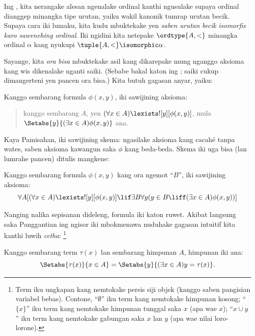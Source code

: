 \documentclass[../../../include/open-logic-section]{subfiles}
\begin{document}

Ing , kita nerangake
alesan ngenalake ordinal kanthi ngusulake supaya
ordinal dianggep minangka tipe urutan, yaiku wakil
kanonik tumrap urutan becik. Supaya cara iki lumaku,
kita kudu mbuktekake yen \emph{saben urutan becik
isomorfis karo sawenehing ordinal}. Iki ngidini
kita netepake $\ordtype{A, <}$ minangka ordinal
$\alpha$ kang nyukupi $\tuple{A, <} \isomorphic \alpha$.

Sayange, kita \emph{ora bisa} mbuktekake asil kang
dikarepake mung nganggo aksioma kang wis dikenalake
nganti saiki. (Sebabe bakal katon ing
; saiki cukup
dimangerteni yen pancen ora bisa.) Kita butuh
gagasan anyar, yaiku:

\begin{axiom}
Kanggo sembarang formula $\phi(x, y)$, iki sawijining aksioma:
\begin{quote}
	kanggo sembarang $A$, yen
	$(\forall x \in A)\lexists![y][\phi(x,y)]$, mula
	$\Setabs{y}{(\exists x \in A)\phi(x,y)}$ ana.
\end{quote}
\end{axiom}
\noindent
Kaya Pamisahan, iki sawijining skema: ngasilake
aksioma kang cacahé tanpa wates, saben aksioma kawangun saka
$\phi$ kang beda-beda. Skema iki uga bisa (lan
lumrahe pancen) ditulis mangkene:

\begin{defish}
Kanggo sembarang formula $\phi(x,y)$ kang ora ngemot
``$B$'', iki sawijining aksioma:
\[
\forall A[(\forall x \in A)\lexists![y][\phi(x,y)] \lif \exists B\forall y (y \in B \liff (\exists x \in A)\phi(x,y))]
\]
\end{defish}

Nanging nalika sepisanan dideleng, formula iki katon
ruwet. Akibat langsung saka Panggantian ing ngisor
iki mbokmenawa nuduhake gagasan intuitif kita kanthi
luwih \emph{cetha}: \footnote{Term iku ungkapan kang
nemtokake persis siji objek (kanggo saben pangisian
variabel bebas). Contone, ``$\emptyset$'' iku term
kang nemtokake himpunan kosong; ``$\{x\}$'' iku
term kang nemtokake himpunan tunggal saka $x$
(apa wae $x$); ``$x \cup y$'' iku term kang nemtokake
gabungan saka $x$ lan $y$ (apa wae nilai loro-lorone).}

\begin{cor}
Kanggo sembarang term $\tau(x)$ lan sembarang
himpunan $A$, himpunan iki ana:
\[
	\Setabs{\tau(x)}{x \in A} = \Setabs{y}{(\exists x \in A)y = \tau(x)}.
\]
\end{cor}
\end{document}
